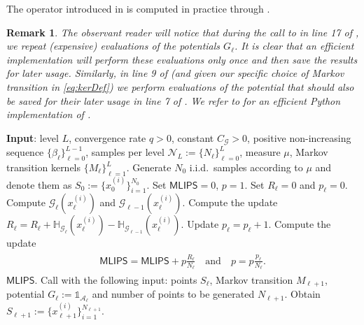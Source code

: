 \documentclass{article}
\newtheorem{remark}[theorem]{Remark}
\newcommand{\cA}{\mathcal{A}}
\newcommand{\cG}{\mathcal{G}}
\newcommand{\cN}{\mathcal{N}}
\newcommand{\IH}{\mathbb{H}}
\newcommand{\bOne}{\mathds{1}}
\theoremstyle{definition}
\begin{document}
The operator introduced in  is computed in practice through .

\begin{remark}
  The observant reader will notice that during the call to  in line 17 of , we repeat
  (expensive) evaluations of the potentials $G_\ell$. It is clear that an efficient implementation will perform these evaluations
  only once and then save the results for later usage. Similarly, in line 9 of  (and given our specific choice of
  Markov transition in \cref{eq:kerDef}) we perform evaluations of the potential that should also be saved for their later usage in
  line 7 of . We refer to \cite{githubCodeC} for an efficient Python implementation of .
\end{remark}

\begin{algorithm}[ht!]
  \begin{algorithmic}[1]
    \STATE \textbf{Input}: level $L$, convergence rate $q>0$, constant $C_\cG>0$, positive non-increasing sequence $\{\beta_\ell\}_{\ell=0}^{L-1}$, samples per level $\cN_L:=\{N_\ell\}_{\ell=0}^L$, measure $\mu$, Markov transition kernels $\{M_\ell\}_{\ell=1}^L$.
    \STATE Generate $N_0$ i.i.d.~samples according to $\mu$ and denote them as $S_0:=\{x_0^{(i)}\}_{i=1}^{N_0}$.
    \STATE Set $\mathsf{MLIPS}=0$, $p=1$.
    \STATE Set $R_\ell = 0$ and $p_\ell = 0$.
    \STATE Compute $\cG_\ell(x^{(i)}_\ell)$ and $\cG_{\ell-1}(x^{(i)}_\ell)$.
    \STATE Compute the update $R_\ell = R_\ell + \IH_{\cG_\ell}(x^{(i)}_\ell)-\IH_{\cG_{\ell-1}}(x^{(i)}_\ell).$
  \IF{$\vert{\cG_\ell(x^{(i)}_\ell)}\vert<C_\cG\alpha^{q+1}\sum^{\infty}_{j=\ell}\alpha^{qj}$}
  \STATE Update $p_\ell = p_\ell + 1$.
  \ENDIF
  \ENDFOR
  \STATE Compute the update
  \begin{align*}
    \begin{gathered}
      \mathsf{MLIPS}=\mathsf{MLIPS}+p\frac{R_\ell}{N_\ell}\quad\text{and}\quad
      p=p\frac{p_\ell}{ N_\ell}.
    \end{gathered}
  \end{align*}
  \RETURN $\mathsf{MLIPS}$.
  \ENDIF
  \STATE Call  with the following input: points $S_{\ell}$, Markov transition $M_{\ell+1}$, potential $G_\ell:=\bOne_{\cA_\ell}$
  and number of points to be generated $N_{\ell+1}$. Obtain $S_{\ell+1}:=\{x_{\ell+1}^{(i)}\}_{i=1}^{N_{\ell+1}}$.
  \ENDFOR
\end{algorithmic}
\caption{Algorithm for the computation of the MLIPS estimator.}
\label{alg:comp}
\end{algorithm}
\end{document}
